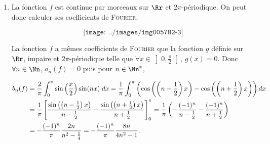 {{\begin{enumerate}
\begin{center}
$\frac{64}{\pi^2}\sum_{n=0}^{+\infty}\frac{1}{(2n+1)^6}=\frac{2}{\pi}\int_{0}^{\pi}x^2(\pi-x)^2\;dx=\frac{2}{\pi}\left[\pi^2\frac{x^3}{3}-2\pi\frac{x^4}{4}+\frac{x^5}{5}\right]_0^\pi=2\pi^4\left(\frac{1}{3}-\frac{1}{2}+\frac{1}{5}\right)=\frac{\pi^4}{15}$
\end{center}

et donc $\sum_{n=0}^{+\infty}\frac{1}{(2n+1)^6}=\frac{\pi^2}{64}\times\frac{\pi^4}{15}=\frac{\pi^6}{960}$. Enfin, si on pose $S=\frac{1}{n^6}$,

\begin{center}
$S=\sum_{n=0}^{+\infty}\frac{1}{(2n+1)^6}+\sum_{n=1}^{+\infty}\frac{1}{(2n)^6}=\frac{\pi^6}{960}+\frac{S}{64}$,
\end{center}

et donc $S=\frac{64}{63}\times\frac{\pi^6}{960}=\frac{\pi^6}{945}$.

\begin{center}
\end{center}

\item   La fonction $f$ est continue par morceaux sur $\Rr$ et $2\pi$-périodique. On peut donc calculer ses coefficients de \textsc{Fourier}.

$$\texttt{[image: ../images/img005782-3]}$$


La fonction $f$ a mêmes coefficients de \textsc{Fourier} que la fonction $g$ définie sur $\Rr$, impaire et $2\pi$-périodique telle que $\forall x\in\left]0,\frac{\pi}{2}\right[$, $g(x)=0$. Donc $\forall n\in\Nn$, $a_n(f)=0$ puis pour $n\in\Nn^*$,

\begin{align*}\ensuremath
b_n(f)&=\frac{2}{\pi}\int_{0}^{\pi}\sin\left(\frac{x}{2}\right)\sin(nx)\;dx=\frac{1}{\pi}\int_{0}^{\pi}\left(\cos\left(\left(n-\frac{1}{2}\right)x\right)-\cos\left(\left(n+\frac{1}{2}\right)x\right)\right)dx\\
 &=\frac{1}{\pi}\left[\frac{\sin\left(\left(n-\frac{1}{2}\right)x\right)}{n-\frac{1}{2}}-\frac{\sin\left(\left(n+\frac{1}{2}\right)x\right)}{n+\frac{1}{2}}\right]_0^\pi=\frac{1}{\pi}\left(-\frac{(-1)^n}{n-\frac{1}{2}}-\frac{(-1)^n}{n+\frac{1}{2}}\right)\\
 &=-\frac{(-1)^n}{\pi}\frac{2n}{n^2-\frac{1}{4}}=-\frac{(-1)^n}{\pi}\frac{8n}{4n^2-1}.
\end{align*}


\end{enumerate}}}
